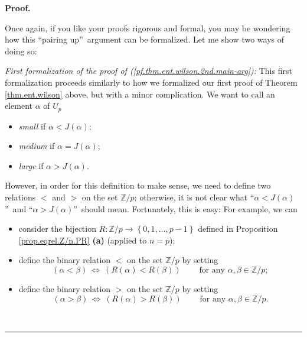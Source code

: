 \documentclass[numbers=enddot,12pt,final,onecolumn,notitlepage]{scrartcl}%
\numberwithin{exer}{subsection}
\theoremstyle{definition}
\newenvironment{fineprint}{\begin{small}}{\end{small}}
\newenvironment{proof}[1][Proof]{\noindent\textbf{#1.} }{\ \rule{0.5em}{0.5em}}
\begin{document}
\begin{proof}
\begin{fineprint}
Once again, if you like your proofs rigorous and formal, you may be wondering
how this \textquotedblleft pairing up\textquotedblright\ argument can be
formalized. Let me show two ways of doing so:

\textit{First formalization of the proof of
(\ref{pf.thm.ent.wilson.2nd.main-arg}):} This first formalization proceeds
similarly to how we formalized our first proof of Theorem \ref{thm.ent.wilson}
above, but with a minor complication. We want to call an element $\alpha$ of
$U_{p}$

\begin{itemize}
\item \textit{small} if $\alpha<J\left(  \alpha\right)  $;

\item \textit{medium} if $\alpha=J\left(  \alpha\right)  $;

\item \textit{large} if $\alpha>J\left(  \alpha\right)  $.
\end{itemize}

However, in order for this definition to make sense, we need to define two
relations $<$ and $>$ on the set $\mathbb{Z}/p$; otherwise, it is not clear
what \textquotedblleft$\alpha<J\left(  \alpha\right)  $\textquotedblright\ and
\textquotedblleft$\alpha>J\left(  \alpha\right)  $\textquotedblright\ should
mean. Fortunately, this is easy: For example, we can

\begin{itemize}
\item consider the bijection $R:\mathbb{Z}/p\rightarrow\left\{  0,1,\ldots
,p-1\right\}  $ defined in Proposition \ref{prop.eqrel.Z/n.PR} \textbf{(a)}
(applied to $n=p$);

\item define the binary relation $<$ on the set $\mathbb{Z}/p$ by setting
\[
\left(  \alpha<\beta\right)  \ \Longleftrightarrow\ \left(  R\left(
\alpha\right)  <R\left(  \beta\right)  \right)  \ \ \ \ \ \ \ \ \ \ \text{for
any }\alpha,\beta\in\mathbb{Z}/p;
\]


\item define the binary relation $>$ on the set $\mathbb{Z}/p$ by setting
\[
\left(  \alpha>\beta\right)  \ \Longleftrightarrow\ \left(  R\left(
\alpha\right)  >R\left(  \beta\right)  \right)  \ \ \ \ \ \ \ \ \ \ \text{for
any }\alpha,\beta\in\mathbb{Z}/p.
\]

\end{itemize}


\end{fineprint}
\end{proof}
\end{document}
